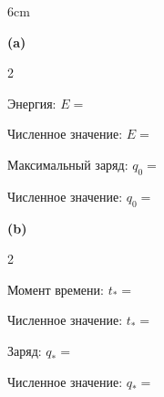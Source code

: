 
\begin{answerboxpart}{6cm}

\textbf{(a)}\vspace{\OlympAnswerGap}

\begin{multicols}{2}

Энергия: \(E=\)

\bigskip

Численное значение: \(E=\)

\columnbreak

Максимальный заряд: \(q_0=\)

\bigskip

Численное значение: \(q_0=\)

\end{multicols}

\vspace{\OlympAnswerGap}
\textbf{(b)}
\vspace{\OlympAnswerGap}

\begin{multicols}{2}

Момент времени: \(t_*=\)

\bigskip

Численное значение: \(t_*=\)

\columnbreak

Заряд: \(q_*=\)

\bigskip

Численное значение: \(q_*=\)

\end{multicols}

\end{answerboxpart}
